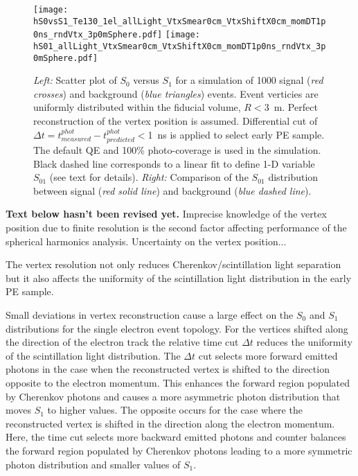 \begin{figure*}[h]
  \centering
  \texttt{[image: hS0vsS1\_Te130\_1el\_allLight\_VtxSmear0cm\_VtxShiftX0cm\_momDT1p0ns\_rndVtx\_3p0mSphere.pdf]}
  \texttt{[image: hS01\_allLight\_VtxSmear0cm\_VtxShiftX0cm\_momDT1p0ns\_rndVtx\_3p0mSphere.pdf]}
  \caption{\emph{Left:} Scatter plot of $S_0$ versus $S_1$ for a simulation of 1000 signal (\emph{red crosses}) and background
    (\emph{blue triangles}) events. Event verticies are uniformly distributed within the fiducial volume, $R<3$~m.
    Perfect reconstruction of the vertex position is assumed. Differential cut of 
    $\Delta t=t^{phot}_{measured} - t^{phot}_{predicted}<$1~ns is applied to select early PE sample.
    The default QE and 100\% photo-coverage is used in the simulation.
    Black dashed line corresponds to a linear fit to define 1-D variable $S_{01}$ (see text for details).
    \emph{Right:} Comparison of the $S_{01}$ distribution between signal (\emph{red solid line}) and background (\emph{blue dashed line}).}
  \label{fig:SL_Te_SmearX0cm_momDT1ns_rndVtx_3p0m}
\end{figure*}


\textbf{Text below hasn't been revised yet.}
Imprecise knowledge of the vertex position due to finite resolution is the second factor affecting performance of the spherical 
harmonics analysis. Uncertainty on the vertex position...

The vertex resolution not only reduces Cherenkov/scintillation light separation but it also affects the uniformity 
of the scintillation light distribution in the early PE sample.

Small deviations in vertex reconstruction cause a large effect
on the $S_0$ and $S_1$ distributions for the single electron event topology.
For the vertices shifted along the direction of the electron track the relative time cut $\Delta t$
reduces the uniformity of the scintillation light distribution. The
$\Delta t$ cut selects more forward emitted photons in the case when
the reconstructed vertex is shifted to the direction opposite to the
electron momentum. This enhances the forward region populated by Cherenkov
photons and causes a more asymmetric photon distribution that moves $S_1$ to higher values.  The opposite occurs for the case where the reconstructed vertex is shifted in the direction along the electron
momentum. Here, the time cut selects more backward emitted photons and counter balances the forward region populated by Cherenkov
photons leading to a more symmetric photon distribution and smaller values of $S_1$.

